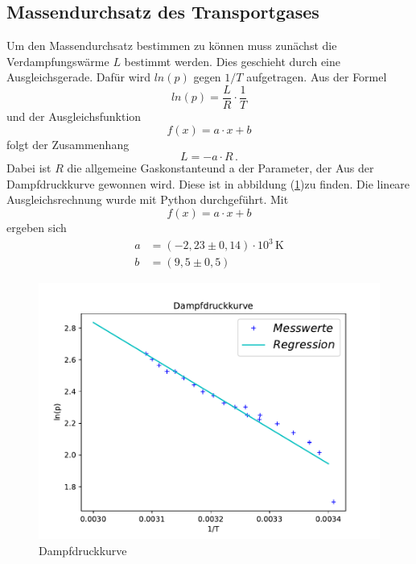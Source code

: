 \subsection{Massendurchsatz des Transportgases}
Um den Massendurchsatz bestimmen zu können muss zunächst die Verdampfungswärme $L$ bestimmt werden.
Dies geschieht durch eine Ausgleichsgerade. Dafür wird $ln(p)$ gegen $1/T$ aufgetragen.
Aus der Formel
\begin{equation*}
  ln(p) = \frac{L}{R}\cdot \frac{1}{T}
\end{equation*}
und der Ausgleichsfunktion
\begin{equation*}
  f(x) = a\cdot x +b
\end{equation*}
folgt der Zusammenhang
\begin{equation*}
  L = -a\cdot R\, .
\end{equation*}
Dabei ist $R$ die allgemeine Gaskonstanteund a der Parameter,
der Aus der Dampfdruckkurve gewonnen wird. Diese ist in abbildung (\ref{fig:Dampf})zu finden.
Die lineare Ausgleichsrechnung wurde mit Python durchgeführt. Mit
\begin{equation*}
  f(x) = a\cdot x+b
\end{equation*}
ergeben sich
\begin{align}
  a &= (-2,23 \pm0,14)\cdot 10^3 \, \mathrm{K} \\
  b &= (9,5 \pm 0,5)
\end{align}
\begin{figure}
  \centering
  \includegraphics[width=\textwidth]{verd.pdf}
  \caption{Dampfdruckkurve}
  \label{fig:Dampf}
\end{figure}

